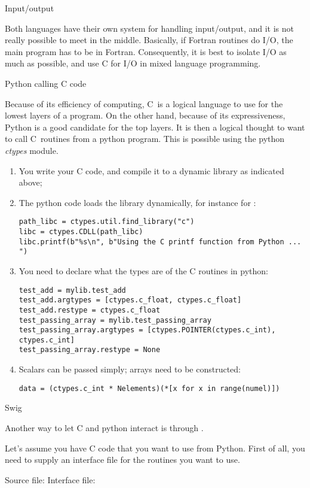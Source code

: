  {Input/output}

Both languages have their own system for handling input/output, and it
is not really possible to meet in the middle. Basically, if Fortran
routines do I/O, the main program has to be in Fortran. Consequently,
it is best to isolate I/O as much as possible, and use C for I/O in
mixed language programming.

 {Python calling C code}


Because of its efficiency of computing, C~is a logical language to use
for the lowest layers of a program. On the other hand, because of its
expressiveness, Python is a good candidate for the top layers. It is
then a logical thought to want to call C~routines from a python
program.
%
This is possible using the python \emph{ctypes}
module.
\begin{enumerate}
\item You write your C code, and compile it to a dynamic library as
  indicated above;
\item The python code loads the library dynamically, for instance for
  :
\begin{verbatim}
path_libc = ctypes.util.find_library("c")
libc = ctypes.CDLL(path_libc)
libc.printf(b"%s\n", b"Using the C printf function from Python ... ")
\end{verbatim}
\item You need to declare what the types are of the C routines in python:
\begin{verbatim}
test_add = mylib.test_add
test_add.argtypes = [ctypes.c_float, ctypes.c_float]
test_add.restype = ctypes.c_float
test_passing_array = mylib.test_passing_array
test_passing_array.argtypes = [ctypes.POINTER(ctypes.c_int), ctypes.c_int]
test_passing_array.restype = None
\end{verbatim}
\item Scalars can be passed simply; arrays need to be constructed:
\begin{verbatim}
data = (ctypes.c_int * Nelements)(*[x for x in range(numel)])
\end{verbatim}
\end{enumerate}

 {Swig}

Another way to let C and python interact is through .

Let's assume you have C code that you want to use from Python.
First of all, you need to supply an interface file for the routines
you want to use.
\begin{multicols}{2}
  Source file:
  \columnbreak
  Interface file:
\end{multicols}

